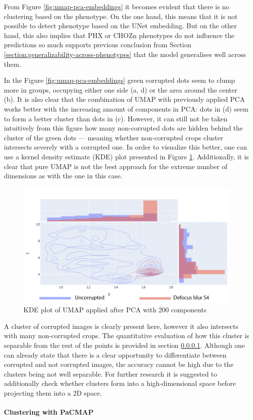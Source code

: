 From Figure \ref{fig:umap-pca-embeddings} it becomes evident that there is no clustering based on the phenotype. On the one hand, this means that it is not possible to detect phenotype based on the UNet embedding. But on the other hand, this also implies that PHX or CHOZn phenotypes do not influence the predictions so much supports previous conclusion from Section \ref{section:generalizability-across-phenotypes} that the model generalises well across them. 

In the Figure \ref{fig:umap-pca-embeddings} green corrupted dots seem to clump more in groups, occupying either one side (a, d) or the area around the center (b). It is also clear that the combination of UMAP with previously applied PCA works better with the increasing amount of components in PCA: dots in (d) seem to form a better cluster than dots in (c). However, it can still not be taken intuitively from this figure how many non-corrupted dots are hidden behind the cluster of the green dots --- meaning whether non-corrupted crops cluster intersects severely with a corrupted one. In order to visualize this better, one can use a kernel density estimate (KDE) plot presented in Figure \ref{fig:kde}. Additionally, it is clear that pure UMAP is not the best approach for the extreme number of dimensions as with the one in this case.

\begin{figure}[htb]
	\begin{center}
		\includegraphics[width=0.6\linewidth]{bilder/unet-embeddings/kde.png}
	\caption{KDE plot of UMAP applied after PCA with 200 components}\label{fig:kde}
	\end{center}
\end{figure}

A cluster of corrupted images is clearly present here, however it also intersects with many non-corrupted crops. The quantitative evaluation of how this cluster is separable from the rest of the points is provided in section \ref{section:clustering-on-unet-embeddings}. Although one can already state that there is a clear opportunity to differentiate between corrupted and not corrupted images, the accuracy cannot be high due to the clusters being not well separable. For further research it is suggested to additionally check whether clusters form into a high-dimensional space before projecting them into a 2D space. 

\paragraph{Clustering with PaCMAP}
\label{section:clustering-on-unet-embeddings}

